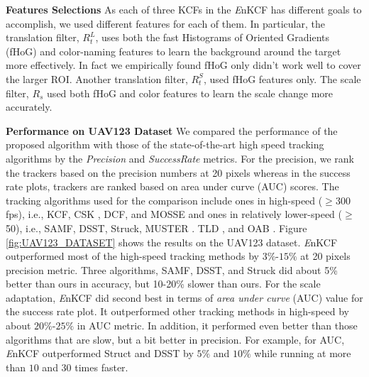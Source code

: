 \documentclass{bmvc2k}
\begin{document}
\textbf{Features Selections} As each of three KCFs in the {\it E}nKCF
has different goals to accomplish, we used different features for each
of them. In particular, the translation filter, $R_{t}^{L}$, uses both
the fast Histograms of Oriented Gradients
(fHoG)\cite{felzenszwalb2010object} and
color-naming\cite{van2009learning} features to learn the background
around the target more effectively. In fact we empirically found fHoG
only didn't work well to cover the larger ROI. Another translation
filter, $R_{t}^{S}$, used fHoG features only. The scale filter,
$R_{s}$ used both fHoG and color features to learn the scale change
more accurately.

\textbf{Performance on UAV123 Dataset} We compared the performance of
the proposed algorithm with those of the state-of-the-art high speed
tracking algorithms by the \textit{Precision} and
\textit{Success\:Rate} metrics. For the precision, we rank the trackers
based on the precision numbers at 20 pixels whereas in the success
rate plots, trackers are ranked based on area under curve (AUC)
scores. The tracking algorithms used for the comparison include ones
in high-speed ($\geq$300 fps), i.e., KCF\cite{henriques2015high}, CSK
\cite{henriques2012exploiting}, DCF\cite{henriques2015high}, and
MOSSE\cite{bolme2010visual,henriques2015high} and ones in relatively
lower-speed ($\geq$50), i.e., SAMF\cite{li2014scale},
DSST\cite{danelljan2014accurate}, Struck\cite{hare2012efficient},
MUSTER \cite{hong2015multi}. TLD \cite{kalal2012tracking}, and OAB
\cite{zhang2012robust}. Figure \ref{fig:UAV123_DATASET} shows the
results on the UAV123 dataset. {\it E}nKCF outperformed most of the
high-speed tracking methods by $3\%$-$15\%$ at 20 pixels precision
metric. Three algorithms, SAMF, DSST, and Struck did about 5\% better
than ours in accuracy, but 10-20\% slower than ours. For the scale
adaptation, {\it E}nKCF did second best in terms of \textit{area under
  curve} (AUC) value for the success rate plot. It outperformed other
tracking methods in high-speed by about $20\%$-$25\%$ in AUC
metric. In addition, it performed even better than those algorithms
that are slow, but a bit better in precision. For example, for AUC,
{\it E}nKCF outperformed Struct and DSST by $5\%$ and $10\%$ while
running at more than $10$ and $30$ times faster.
\end{document}
